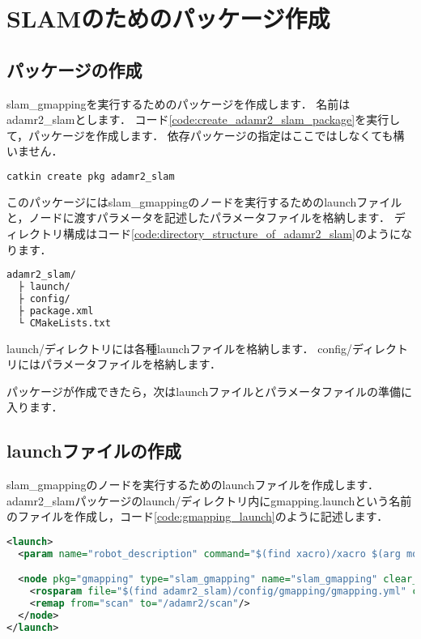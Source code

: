 \documentclass[{../../master}]{subfiles}
\begin{document}
\section{SLAMのためのパッケージ作成}

\subsection{パッケージの作成}

\textsf{slam\_gmapping}を実行するためのパッケージを作成します．
名前は\textsf{adamr2\_slam}とします．
コード\ref{code:create_adamr2_slam_package}を実行して，パッケージを作成します．
依存パッケージの指定はここではしなくても構いません．

\begin{lstlisting}[language=sh, label=code:create_adamr2_slam_package, caption=Create \textsf{adamr2\_slam} Package]
catkin create pkg adamr2_slam
\end{lstlisting}

このパッケージには\textsf{slam\_gmapping}のノードを実行するためのlaunchファイルと，ノードに渡すパラメータを記述したパラメータファイルを格納します．
ディレクトリ構成はコード\ref{code:directory_structure_of_adamr2_slam}のようになります．

\begin{lstlisting}[language=sh, caption=Directory Structure of adamr2\_slam, label=code:directory_structure_of_adamr2_slam]
adamr2_slam/
  ├ launch/
  ├ config/
  ├ package.xml
  └ CMakeLists.txt
\end{lstlisting}

\textsf{launch/}ディレクトリには各種launchファイルを格納します．
\textsf{config/}ディレクトリにはパラメータファイルを格納します．

パッケージが作成できたら，次はlaunchファイルとパラメータファイルの準備に入ります．

\subsection{launchファイルの作成}

\textsf{slam\_gmapping}のノードを実行するためのlaunchファイルを作成します．
\textsf{adamr2\_slam}パッケージの\textsf{launch/}ディレクトリ内に\textsf{gmapping.launch}という名前のファイルを作成し，コード\ref{code:gmapping_launch}のように記述します．

\begin{lstlisting}[language=XML, label=code:gmapping_launch, caption=\textsf{gmapping.launch}]
<launch>
  <param name="robot_description" command="$(find xacro)/xacro $(arg model)"/>

  <node pkg="gmapping" type="slam_gmapping" name="slam_gmapping" clear_params="true">
    <rosparam file="$(find adamr2_slam)/config/gmapping/gmapping.yml" command="load"/>
    <remap from="scan" to="/adamr2/scan"/>
  </node>
</launch>
\end{lstlisting}
\end{document}
